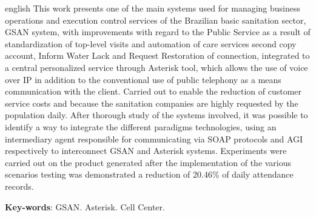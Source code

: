 \begin{resumo}[Abstract]
 \begin{otherlanguage*}{english}
This work presents one of the main systems used for managing business operations and execution control services of the Brazilian basic sanitation sector, GSAN system, with improvements with regard to the Public Service as a result of standardization of top-level visits and automation of care services second copy account, Inform Water Lack and Request Restoration of connection, integrated to a central personalized service through Asterisk tool, which allows the use of voice over IP in addition to the conventional use of public telephony as a means communication with the client. Carried out to enable the reduction of customer service costs and because the sanitation companies are highly requested by the population daily. After thorough study of the systems involved, it was possible to identify a way to integrate the different paradigms technologies, using an intermediary agent responsible for communicating via SOAP protocols and AGI respectively to interconnect GSAN and Asterisk systems. Experiments were carried out on the product generated after the implementation of the various scenarios testing was demonstrated a reduction of 20.46\% of daily attendance records.

   \vspace{\onelineskip}
 
   \noindent 
   \textbf{Key-words}: GSAN. Asterisk. Cell Center.
 \end{otherlanguage*}
\end{resumo}